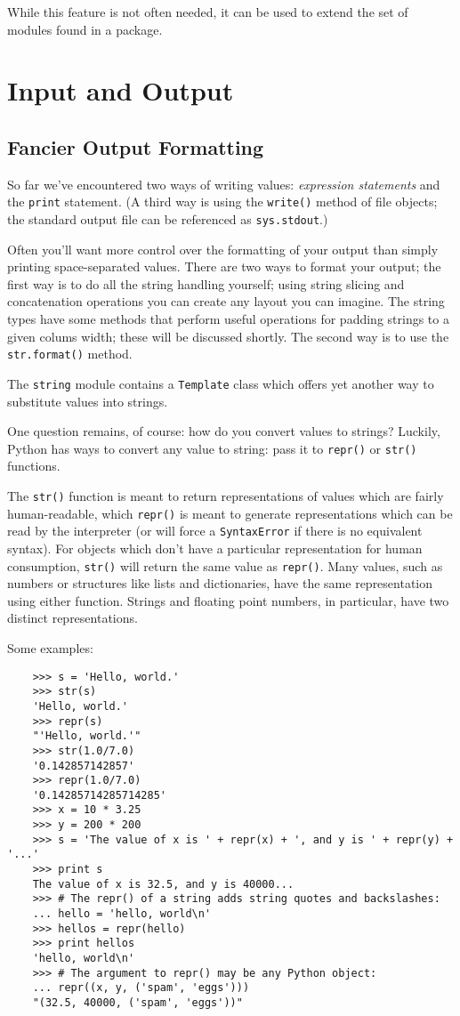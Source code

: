 \documentclass[UTF8]{article}
\begin{document}
While this feature is not often needed, it can be used to extend the set of modules found in a
package.

\section{Input and Output}
\subsection{Fancier Output Formatting}
So far we've encountered two ways of writing values: \emph{expression statements} and the
\texttt{print} statement. (A third way is using the \texttt{write()} method of file objects; the
standard output file can be referenced as \texttt{sys.stdout}.)

Often you'll want more control over the formatting of your output than simply printing
space-separated values. There are two ways to format your output; the first way is to do all the
string handling yourself; using string slicing and concatenation operations you can create any
layout you can imagine. The string types have some methods that perform useful operations for
padding strings to a given colums width; these will be discussed shortly. The second way is to use
the \texttt{str.format()} method.

The \texttt{string} module contains a \texttt{Template} class which offers yet another way to
substitute values into strings.

One question remains, of course: how do you convert values to strings? Luckily, Python has ways to
convert any value to string: pass it to \texttt{repr()} or \texttt{str()} functions.

The \texttt{str()} function is meant to return representations of values which are fairly
human-readable, which \texttt{repr()} is meant to generate representations which can be read by the
interpreter (or will force a \texttt{SyntaxError} if there is no equivalent syntax). For objects
which don't have a particular representation for human consumption, \texttt{str()} will return the
same value as \texttt{repr()}. Many values, such as numbers or structures like lists and
dictionaries, have the same representation using either function. Strings and floating point
numbers, in particular, have two distinct representations.

Some examples:
\begin{verbatim}
    >>> s = 'Hello, world.'
    >>> str(s)
    'Hello, world.'
    >>> repr(s)
    "'Hello, world.'"
    >>> str(1.0/7.0)
    '0.142857142857'
    >>> repr(1.0/7.0)
    '0.14285714285714285'
    >>> x = 10 * 3.25
    >>> y = 200 * 200
    >>> s = 'The value of x is ' + repr(x) + ', and y is ' + repr(y) + '...'
    >>> print s
    The value of x is 32.5, and y is 40000...
    >>> # The repr() of a string adds string quotes and backslashes:
    ... hello = 'hello, world\n'
    >>> hellos = repr(hello)
    >>> print hellos
    'hello, world\n'
    >>> # The argument to repr() may be any Python object:
    ... repr((x, y, ('spam', 'eggs')))
    "(32.5, 40000, ('spam', 'eggs'))"
\end{verbatim}
\end{document}

